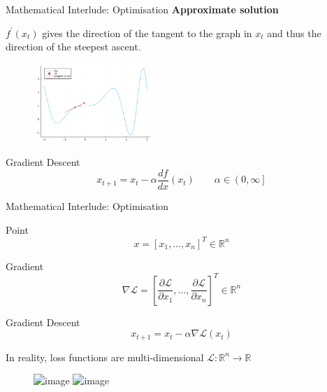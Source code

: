 \documentclass{beamer}
\begin{document}
\begin{frame}{Mathematical Interlude: Optimisation}
    \textbf{Approximate solution}

    $f^\prime(x_t)$ gives the direction of the tangent to the graph in $x_t$ and thus the direction of the steepest ascent.
    \begin{figure}
        \centering
        \includegraphics[width=0.4\textwidth]{./images/04_derivative_1d.png}
    \end{figure}
    \begin{block}{Gradient Descent}
        $$x_{t+1} = x_t - \alpha \frac{df}{dx}(x_t) \qquad \alpha \in \left(0, \infty \right]$$
    \end{block}
\end{frame}

\begin{frame}{Mathematical Interlude: Optimisation}

    \begin{minipage}[c]{0.45\textwidth}
        \begin{block}{Point}
            $$x = \left[x_1, \ldots, x_n\right]^T \in \mathbb{R}^n$$
        \end{block}
        \begin{block}{Gradient}
            $$\nabla \mathcal{L} = \left[
                    \frac{\partial \mathcal{L}}{\partial x_1}, \ldots, \frac{\partial \mathcal{L}}{\partial x_n}
                    \right]^T \in \mathbb{R}^n$$
        \end{block}
        \begin{block}{Gradient Descent}
            $$x_{t+1} = x_t - \alpha \nabla \mathcal{L}(x_t)$$
        \end{block}
    \end{minipage}
    \hfill
    \begin{minipage}[c]{0.45\textwidth}
        In reality, loss functions are multi-dimensional $\mathcal{L}: \mathbb{R}^n \rightarrow \mathbb{R}$

        \vfill

        \begin{figure}
            \centering
            \includegraphics<1>[width=\textwidth]{./images/05_function_2d.png}
            \includegraphics<2>[width=\textwidth]{./images/05_contour_2d.png}
        \end{figure}
    \end{minipage}
\end{frame}
\end{document}
